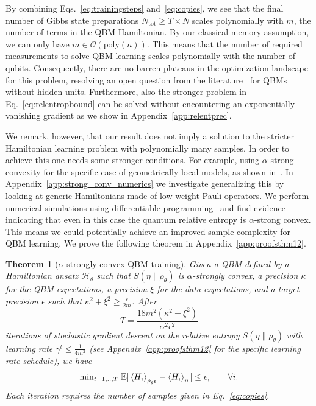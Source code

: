 \documentclass[
    aps,
    prx,
    onecolumn
]{revtex4-2}
\newtheorem{theorem}{Theorem}
\begin{document}
By combining Eqs.~\eqref{eq:trainingsteps} and~\eqref{eq:copies}, we see that the final number of Gibbs state preparations $N_{\mathrm{tot}}\geq T\times N$ scales polynomially with $m$, the number of terms in the QBM Hamiltonian. By our classical memory assumption, we can only have $m \in \mathcal{O}(\mathrm{poly}(n))$. This means that the number of required measurements to solve QBM learning scales polynomially with the number of qubits. Consequently, there are no barren plateaus in the optimization landscape for this problem, resolving an open question from the literature~\cite{Anschuetz_2022, Kieferova_2021} for QBMs without hidden units. Furthermore, also the stronger problem in Eq.~\eqref{eq:relentropbound} can be solved without encountering an exponentially vanishing gradient as we show in Appendix~\ref{app:relentprec}.

We remark, however, that our result does not imply a solution to the stricter Hamiltonian learning problem with polynomially many samples. In order to achieve this one needs some stronger conditions. For example, using $\alpha$-strong convexity for the specific case of geometrically local models, as shown in~\cite{Anshu_2021}. In Appendix~\ref{app:strong_conv_numerics} we investigate generalizing this by looking at generic Hamiltonians made of low-weight Pauli operators. We perform numerical simulations using differentiable programming~\cite{Baydin2017} and find evidence indicating that even in this case the quantum relative entropy is $\alpha$-strong convex. This means we could potentially achieve an improved sample complexity for QBM learning. We prove the following theorem in Appendix~\ref{app:proofsthm12}. 

\begin{theorem}[$\alpha$-strongly convex QBM training]
\label{thm:training_alpha}
Given a QBM defined by a Hamiltonian ansatz $\mathcal{H}_\theta$ such that $S(\eta\|\rho_\theta)$ is $\alpha$-strongly convex, a precision $\kappa$ for the QBM expectations, a precision $\xi$ for the data expectations, and a target precision $\epsilon$ such that $\kappa^2 + \xi^2 \geq \frac{\epsilon}{2m}$. After
\begin{equation}
    T =\frac{18 m^2 (\kappa^2 + \xi^2)}{\alpha^2\epsilon^2}
\end{equation}
iterations of stochastic gradient descent on the relative entropy $S(\eta \|\rho_\theta)$ with learning rate $\gamma^t \leq \frac{1}{4m^2}$ (see Appendix~\ref{app:proofsthm12} for the specific learning rate schedule), we have
\begin{equation}
    \mathrm{min}_{t=1,..,T} \; \mathbb{E}| \expval{H_i}_{\rho_{\theta^t}}  - \expval{H_i}_\eta | \leq \epsilon, \qquad \forall i.
\end{equation} 
Each iteration requires the number of samples given in Eq.~\eqref{eq:copies}. 
\end{theorem} 
\end{document}
